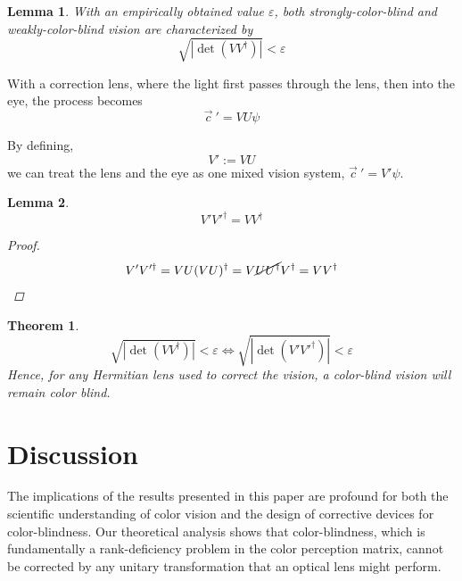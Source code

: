 \documentclass[10pt,a4paper]{article}
\newtheorem{thm}{Theorem} [section]
\newtheorem{lem}{Lemma}[section]
\theoremstyle{definition}
\theoremstyle{remark}
\numberwithin{equation}{section}
\newcommand{\abs}[1]{\left\vert#1\right\vert}
\newcommand{\eps}{\varepsilon}
\newcommand{\pdet}[1]{            \sqrt{\abs{   \det    \left(#1 #1^\dagger \right)   }}               }
\begin{document}
\begin{lem}
With an empirically obtained value $\eps$, both strongly-color-blind and weakly-color-blind vision are characterized by 
\begin{equation}
\pdet{V} < \eps
\end{equation}
\end{lem}


With a correction lens, where the light first passes through the lens, then into the eye, the process becomes
\begin{equation}
\vec{c}~' = V U \psi 
\end{equation}

By defining, 
\begin{equation}
V':=VU
\end{equation}
we can treat the lens and the eye as one mixed vision system, $\vec{c}~' = V' \psi $.

\begin{lem}
\begin{equation}
V' V'^\dagger = V V^\dagger 
\end{equation}

\begin{proof}
\begin{eqnarray}
V' V'^\dagger = VU (VU)^\dagger 
                      =  V \cancel{ U U^\dagger } V^\dagger 
                      =  V V^\dagger 
\end{eqnarray}
\end{proof}
\end{lem}

\begin{thm}
\begin{equation}
\pdet{V} < \eps \iff  \pdet{V'} < \eps
\end{equation}
Hence, for any Hermitian lens used to correct the vision, a color-blind vision will remain color blind.
\end{thm}

\section{Discussion}

The implications of the results presented in this paper are profound for both the scientific understanding of color vision and the design of corrective devices for color-blindness. Our theoretical analysis shows that color-blindness, which is fundamentally a rank-deficiency problem in the color perception matrix, cannot be corrected by any unitary transformation that an optical lens might perform.
\end{document}
